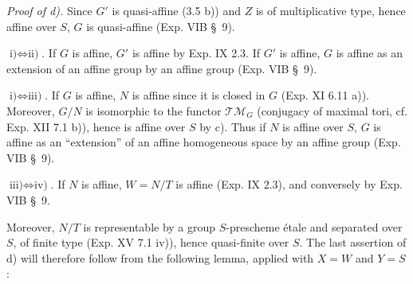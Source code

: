 \par\noindent\emph{Proof of d).}
Since $G'$ is quasi-affine (3.5 b)) and $Z$ is of multiplicative type, hence affine over $S$, $G$ is quasi-affine (Exp. VIB \S\ 9).

$\text{i)}\Leftrightarrow\text{ii)}$. If $G$ is affine, $G'$ is affine by Exp. IX 2.3. If $G'$ is affine, $G$ is affine as an extension of an affine group by an affine group (Exp. VIB \S\ 9).

$\text{i)}\Leftrightarrow\text{iii)}$. If $G$ is affine, $N$ is affine since it is closed in $G$ (Exp. XI 6.11 a)). Moreover, $G/N$ is isomorphic to the functor $\mathscr{TM}_G$ (conjugacy of maximal tori, cf. Exp. XII 7.1 b)), hence is affine over $S$ by c). Thus if $N$ is affine over $S$, $G$ is affine as an ``extension'' of an affine homogeneous space by an affine group (Exp. VIB \S\ 9).

$\text{iii)}\Leftrightarrow\text{iv)}$. If $N$ is affine, $W=N/T$ is affine (Exp. IX 2.3), and conversely by Exp. VIB \S\ 9.

Moreover, $N/T$ is representable by a group $S$-prescheme étale and separated over $S$, of finite type (Exp. XV 7.1 iv)), hence quasi-finite over $S$. The last assertion of d) will therefore follow from the following lemma, applied with $X=W$ and $Y=S$:

